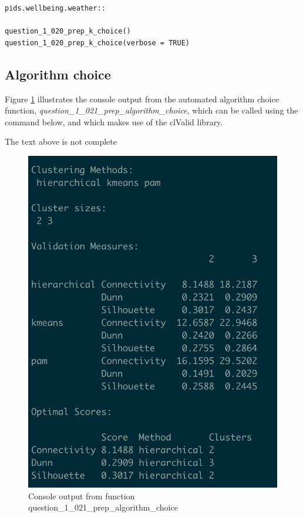 \documentclass[12pt, oneside, openany]{book}
\begin{document}
\bigskip
\begin{lstlisting}
pids.wellbeing.weather::

question_1_020_prep_k_choice()
question_1_020_prep_k_choice(verbose = TRUE)
\end{lstlisting}

\subsection*{Algorithm choice}
Figure \ref{fig:question_1_021_prep_algorithm_choice_console_ouput} illustrates the console output from the automated algorithm choice function, \emph{question\_1\_021\_prep\_algorithm\_choice}, which can be called using the command below, and which makes use of the clValid library.

\color{red}The text above is not complete\color{black}

\begin{figure}
	\centering
	\captionsetup{justification=centering}
	\includegraphics[scale=0.6]{question_1_021_prep_algorithm_choice_console_ouput}
	\caption{Console output from function \emph{}question\_1\_021\_prep\_algorithm\_choice}
	\label{fig:question_1_021_prep_algorithm_choice_console_ouput}
\end{figure}
\end{document}
